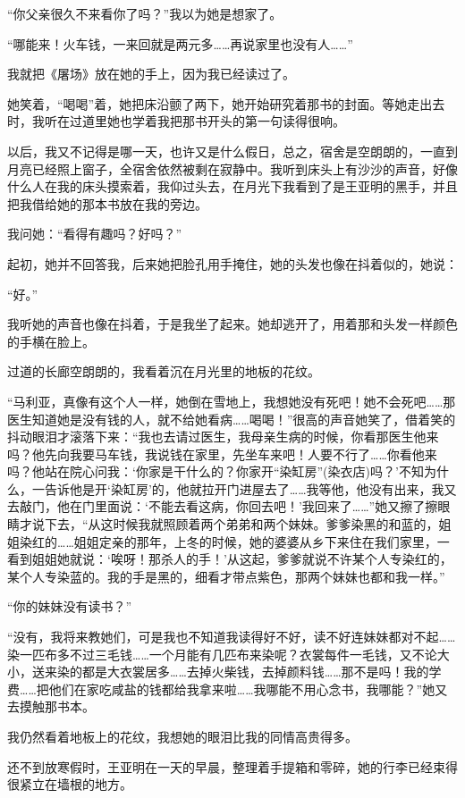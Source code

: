\par “你父亲很久不来看你了吗？”我以为她是想家了。
\par “哪能来！火车钱，一来回就是两元多……再说家里也没有人……”
\par 我就把《屠场》放在她的手上，因为我已经读过了。
\par 她笑着，“喝喝”着，她把床沿颤了两下，她开始研究着那书的封面。等她走出去时，我听在过道里她也学着我把那书开头的第一句读得很响。
\par 以后，我又不记得是哪一天，也许又是什么假日，总之，宿舍是空朗朗的，一直到月亮已经照上窗子，全宿舍依然被剩在寂静中。我听到床头上有沙沙的声音，好像什么人在我的床头摸索着，我仰过头去，在月光下我看到了是王亚明的黑手，并且把我借给她的那本书放在我的旁边。
\par 我问她：“看得有趣吗？好吗？”
\par 起初，她并不回答我，后来她把脸孔用手掩住，她的头发也像在抖着似的，她说：
\par “好。”
\par 我听她的声音也像在抖着，于是我坐了起来。她却逃开了，用着那和头发一样颜色的手横在脸上。
\par 过道的长廊空朗朗的，我看着沉在月光里的地板的花纹。
\par “马利亚，真像有这个人一样，她倒在雪地上，我想她没有死吧！她不会死吧……那医生知道她是没有钱的人，就不给她看病……喝喝！”很高的声音她笑了，借着笑的抖动眼泪才滚落下来：“我也去请过医生，我母亲生病的时候，你看那医生他来吗？他先向我要马车钱，我说钱在家里，先坐车来吧！人要不行了……你看他来吗？他站在院心问我：‘你家是干什么的？你家开“染缸房”(染衣店)吗？’不知为什么，一告诉他是开‘染缸房’的，他就拉开门进屋去了……我等他，他没有出来，我又去敲门，他在门里面说：‘不能去看这病，你回去吧！’我回来了……”她又擦了擦眼睛才说下去，“从这时候我就照顾着两个弟弟和两个妹妹。爹爹染黑的和蓝的，姐姐染红的……姐姐定亲的那年，上冬的时候，她的婆婆从乡下来住在我们家里，一看到姐姐她就说：‘唉呀！那杀人的手！’从这起，爹爹就说不许某个人专染红的，某个人专染蓝的。我的手是黑的，细看才带点紫色，那两个妹妹也都和我一样。”
\par “你的妹妹没有读书？”
\par “没有，我将来教她们，可是我也不知道我读得好不好，读不好连妹妹都对不起……染一匹布多不过三毛钱……一个月能有几匹布来染呢？衣裳每件一毛钱，又不论大小，送来染的都是大衣裳居多……去掉火柴钱，去掉颜料钱……那不是吗！我的学费……把他们在家吃咸盐的钱都给我拿来啦……我哪能不用心念书，我哪能？”她又去摸触那书本。
\par 我仍然看着地板上的花纹，我想她的眼泪比我的同情高贵得多。
\par 还不到放寒假时，王亚明在一天的早晨，整理着手提箱和零碎，她的行李已经束得很紧立在墙根的地方。

